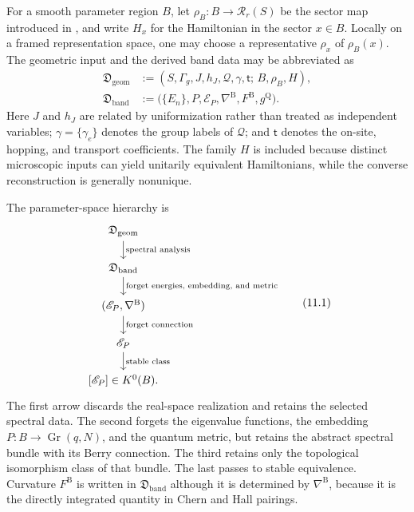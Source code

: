 \documentclass[11pt]{article}
\theoremstyle{definition}
\theoremstyle{remark}
\newcommand{\cR}{\mathcal R}
\begin{document}
For a smooth parameter region \(B\), let
\(\rho_B:B\to\cR_r(S)\) be the sector map introduced in
, and write \(H_x\) for the Hamiltonian in the
sector \(x\in B\).  Locally on a framed representation space, one may choose
a representative \(\rho_x\) of \(\rho_B(x)\).  The geometric input and the
derived band data may be abbreviated as
\begin{align*}
\mathfrak D_{\mathrm{geom}}
  &:=
  (S,\Gamma_g,J,h_J,\mathcal Q,\gamma,\mathsf t;\,
       B,\rho_B,H),\\
\mathfrak D_{\mathrm{band}}
  &:=
  \bigl(\{E_n\},P,\mathscr E_P,
        \nabla^{\mathrm B},F^{\mathrm B},g^{\mathrm Q}\bigr).
\end{align*}
Here \(J\) and \(h_J\) are related by uniformization rather than treated as
independent variables; \(\gamma=\{\gamma_e\}\) denotes the group labels of
\(\mathcal Q\); and \(\mathsf t\) denotes the on-site, hopping, and transport
coefficients.  The family \(H\) is included because distinct microscopic
inputs can yield unitarily equivalent Hamiltonians, while the converse
reconstruction is generally nonunique.

The parameter-space hierarchy is
\[
\begin{tikzcd}[row sep=1.65em]
\mathfrak D_{\mathrm{geom}}
  \arrow[d, "\text{spectral analysis}"]\\
\mathfrak D_{\mathrm{band}}
  \arrow[d, "\text{forget energies, embedding, and metric}"]\\
(\mathscr E_P,\nabla^{\mathrm B})
  \arrow[d, "\text{forget connection}"]\\
{\mathscr E_P}
  \arrow[d, "\text{stable class}"]\\
{[\mathscr E_P]\in K^0(B)}.
\end{tikzcd}
\tag{11.1}\label{eq:information-hierarchy}
\]
The first arrow discards the real-space realization and retains the selected
spectral data.  The second forgets the eigenvalue functions, the embedding
\(P:B\to\operatorname{Gr}(q,N)\), and the quantum metric, but retains the
abstract spectral bundle with its Berry connection.  The third retains only
the topological isomorphism class of that bundle.  The last passes to stable
equivalence.  Curvature \(F^{\mathrm B}\) is written in
\(\mathfrak D_{\mathrm{band}}\) although it is determined by
\(\nabla^{\mathrm B}\), because it is the directly integrated quantity in
Chern and Hall pairings.
\end{document}
